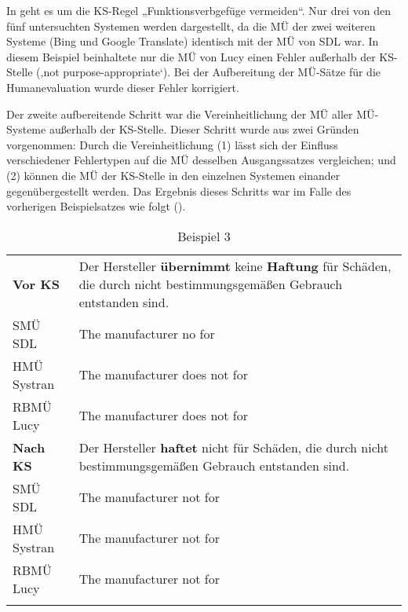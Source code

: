 In  geht es um die KS-Regel „Funktionsverbgefüge vermeiden“. Nur drei von den fünf untersuchten Systemen werden dargestellt, da die MÜ der zwei weiteren Systeme (Bing und Google Translate) identisch mit der MÜ von SDL war. In diesem Beispiel beinhaltete nur die MÜ von Lucy einen Fehler außerhalb der KS-Stelle (‚not purpose-appropriate‘). Bei der Aufbereitung der MÜ-Sätze für die Humanevaluation wurde dieser Fehler korrigiert.

Der zweite aufbereitende Schritt war die Vereinheitlichung der MÜ aller MÜ-Systeme außerhalb der KS-Stelle. Dieser Schritt wurde aus zwei Gründen vorgenommen: Durch die Vereinheitlichung (1) lässt sich der Einfluss verschiedener Fehlertypen auf die MÜ desselben Ausgangssatzes vergleichen; und (2) können die MÜ der KS-Stelle in den einzelnen Systemen einander gegenübergestellt werden. Das Ergebnis dieses Schritts war im Falle des vorherigen Beispielsatzes wie folgt ().


\begin{table}
    \begin{tabularx}{\textwidth}{lQ}
\lsptoprule
\textbf{Vor KS} & Der Hersteller \textbf{übernimmt} keine \textbf{Haftung} für Schäden, die durch nicht bestimmungsgemäßen Gebrauch entstanden sind. \\
\tablevspace
SMÜ SDL & The manufacturer  no  for  \\
HMÜ Systran & The manufacturer does not   for  \\
RBMÜ Lucy & The manufacturer does not   for  \\
\midrule
\textbf{Nach KS} & Der Hersteller \textbf{haftet} nicht für Schäden, die durch nicht bestimmungsgemäßen Gebrauch entstanden sind.\\
\tablevspace
SMÜ SDL & The manufacturer  not  for  \\
HMÜ Systran & The manufacturer  not  for  \\
RBMÜ Lucy & The manufacturer  not  for  \\
\lspbottomrule
    \end{tabularx}
    \caption{Beispiel 3}
    \label{tabex:3}

\end{table}

